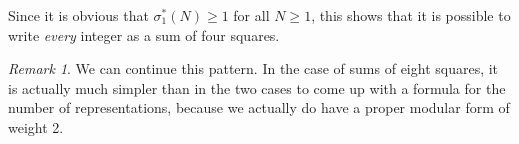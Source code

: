 \documentclass{article}
\theoremstyle{plain}
\newtheorem{theorem}{Theorem}
\theoremstyle{remark}
\newtheorem*{example}{Example}
\newtheorem*{remark}{Remark}
\theoremstyle{definition}
\begin{document}
Since it is obvious that $\sigma_1^*(N) \geq 1$ for all $N \geq 1$, this shows that it is possible to write {\it every} integer as a sum of four squares.

\begin{remark}
    We can continue this pattern. In the case of sums of eight squares, it is actually much simpler than in the two cases to come up with a formula for the number of representations, because we actually do have a proper modular form of weight 2.
\end{remark}




    

\end{document}
